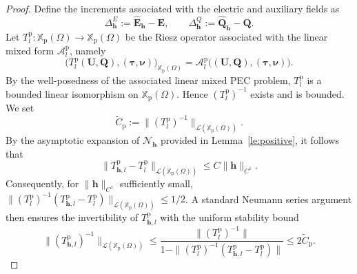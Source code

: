 \documentclass[10pt,a4paper]{amsart}
\numberwithin{equation}{section}
\begin{document}
\begin{proof}

Define the increments associated with the electric and auxiliary fields as
\[
\Delta_{\mathbf{h}}^E := \hat{\mathbf{E}}_{\mathbf{h}} - \mathbf{E}, \qquad \Delta_{\mathbf{h}}^Q := \hat{\mathbf{Q}}_{\mathbf{h}} - \mathbf{Q}.
\]
Let
$
T_l^{\mathrm p}:\mathbb X_{\mathrm p}(\Omega)\to
\mathbb X_{\mathrm p}(\Omega)$
be the Riesz operator associated with the linear mixed form
\(\mathcal A_l^{\mathrm p}\), namely
\[
\bigl(
T_l^{\mathrm p}(\mathbf U,\mathbf Q),
(\boldsymbol\tau,\boldsymbol\nu)
\bigr)_{\mathbb X_{\mathrm p}(\Omega)}
=
\mathcal A_l^{\mathrm p}
\bigl(
(\mathbf U,\mathbf Q),
(\boldsymbol\tau,\boldsymbol\nu)
\bigr).
\]
By the well-posedness of the associated linear mixed PEC problem,
\(T_l^{\mathrm p}\) is a bounded linear isomorphism on
\(\mathbb X_{\mathrm p}(\Omega)\). Hence
\((T_l^{\mathrm p})^{-1}\) exists and is bounded. We set
\[
\widetilde C_{\mathrm p}
:=
\bigl\|(T_l^{\mathrm p})^{-1}\bigr\|_
{\mathcal L(\mathbb X_{\mathrm p}(\Omega))}.
\]By the asymptotic expansion of $\mathcal{N}_{\mathbf{h}}$ provided in Lemma~\ref{le:positive}, it follows that
\[
\|T_{\mathbf{h},l}^{\mathrm{p}} - T_l^{\mathrm{p}}\|_{\mathcal{L}(\mathbb{X}_{\mathrm{p}}(\Omega))} \le C \|\mathbf{h}\|_{C^1}.
\]
Consequently, for $\|\mathbf{h}\|_{C^1}$ sufficiently small, $\|(T_l^{\mathrm{p}})^{-1} (T_{\mathbf{h},l}^{\mathrm{p}} - T_l^{\mathrm{p}})\|_{\mathcal{L}(\mathbb{X}_{\mathrm{p}}(\Omega))} \le 1/2$. A standard Neumann series argument then ensures the invertibility of $T_{\mathbf{h},l}^{\mathrm{p}}$ with the uniform stability bound
\[
\|(T_{\mathbf{h},l}^{\mathrm{p}})^{-1}\|_{\mathcal{L}(\mathbb{X}_{\mathrm{p}}(\Omega))} \le \frac{\|(T_l^{\mathrm{p}})^{-1}\|}{1 - \|(T_l^{\mathrm{p}})^{-1}(T_{\mathbf{h},l}^{\mathrm{p}} - T_l^{\mathrm{p}})\|} \le 2\widetilde{C}_{\mathrm{p}}.
\]


\end{proof}
\end{document}

